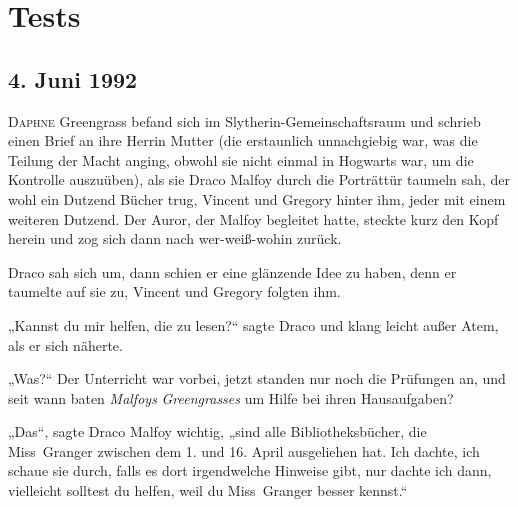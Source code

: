 \chapter{Tests}

\section{4. Juni 1992}

\lettrine{D}{aphne} Greengrass befand sich im Slytherin-Gemeinschaftsraum und schrieb einen Brief an ihre Herrin Mutter (die erstaunlich unnachgiebig war, was die Teilung der Macht anging, obwohl sie nicht einmal in Hogwarts war, um die Kontrolle auszuüben), als sie Draco Malfoy durch die Porträttür taumeln sah, der wohl ein Dutzend Bücher trug, Vincent und Gregory hinter ihm, jeder mit einem weiteren Dutzend. Der Auror, der Malfoy begleitet hatte, steckte kurz den Kopf herein und zog sich dann nach wer-weiß-wohin zurück.

Draco sah sich um, dann schien er eine glänzende Idee zu haben, denn er taumelte auf sie zu, Vincent und Gregory folgten ihm.

„Kannst du mir helfen, die zu lesen?“ sagte Draco und klang leicht außer Atem, als er sich näherte.

„Was?“ Der Unterricht war vorbei, jetzt standen nur noch die Prüfungen an, und seit wann baten \emph{Malfoys} \emph{Greengrasses} um Hilfe bei ihren Hausaufgaben?

„Das“, sagte Draco Malfoy wichtig, „sind alle Bibliotheksbücher, die Miss~Granger zwischen dem 1. und 16. April ausgeliehen hat. Ich dachte, ich schaue sie durch, falls es dort irgendwelche Hinweise gibt, nur dachte ich dann, vielleicht solltest du helfen, weil du Miss~Granger besser kennst.“

